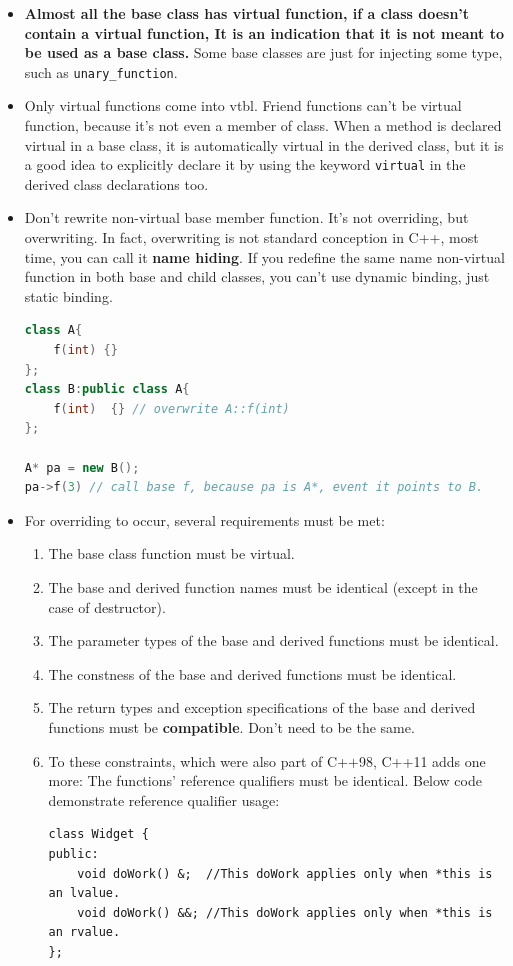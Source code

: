 \documentclass[a4paper,11pt,twoside]{book}
\begin{document}
\begin{itemize}
	\item \textbf{Almost all the base class has virtual function, if a class doesn't contain a virtual function, It is an indication that it is not meant to be used as a base class.} Some base classes are just for injecting some type, such as \texttt{unary\_function}.
	
	\item Only virtual functions come into vtbl. Friend functions can't be virtual function, because it's not even a member of class. When a method is declared virtual in a base class, it is automatically virtual in the derived class, but it is a good idea to explicitly declare it by using the keyword \texttt{virtual} in the derived class declarations too.
	
	\item Don't rewrite non-virtual base member function. It's not overriding, but overwriting. In fact, overwriting is not standard conception in C++, most time, you can call it \textbf{name hiding}. If you redefine the same name non-virtual function in both base and child classes, you can't use dynamic binding, just static binding. 
\begin{lstlisting}[frame=single, language=c++]
class A{
	f(int) {}
};
class B:public class A{
	f(int)  {} // overwrite A::f(int)
};

A* pa = new B();
pa->f(3) // call base f, because pa is A*, event it points to B. 	
\end{lstlisting}

	\item For overriding to occur, several requirements must be met:
	\begin{enumerate}
		\item The base class function must be virtual.
		\item The base and derived function names must be identical (except in the case of
		destructor).
		\item The parameter types of the base and derived functions must be identical.
		\item The constness of the base and derived functions must be identical.
		\item The return types and exception specifications of the base and derived functions
		must be \textbf{compatible}. Don't need to be the same.
		\item To these constraints, which were also part of C++98, C++11 adds one more: The functions' reference qualifiers must be identical. Below code demonstrate reference qualifier usage:
\begin{lstlisting}
class Widget {
public:
	void doWork() &;  //This doWork applies only when *this is an lvalue.
	void doWork() &&; //This doWork applies only when *this is an rvalue.
}; 
	

\end{lstlisting}
\end{enumerate}
\end{itemize}
\end{document}
